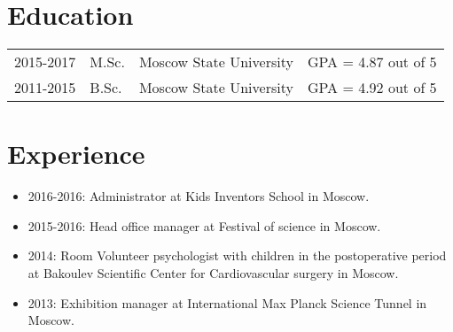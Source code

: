 \documentclass[a4paper,10pt]{article}
\begin{document}
\section*{Education}
\begin{tabular}{llll}
2015-2017 &  M.Sc.  & Moscow State University & GPA = 4.87 out of 5\\
2011-2015 & B.Sc. & Moscow State University &  GPA = 4.92 out of 5\\
\end{tabular}

\section*{Experience}
\begin{itemize}
\item 2016-2016: Administrator at Kids Inventors School in Moscow.
\item 2015-2016: Head office manager at Festival of science in Moscow.
\item 2014: Room Volunteer psychologist with children in the postoperative period at Bakoulev Scientific Center for Cardiovascular surgery in Moscow.
\item 2013: Exhibition manager at International Max Planck Science Tunnel in Moscow.
\end{itemize}
\end{document}
